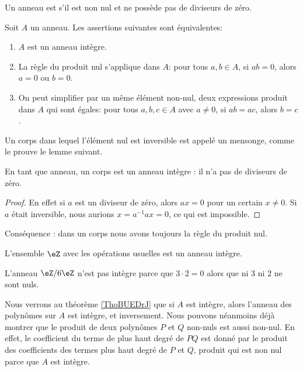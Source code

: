 \begin{definition}
    Un anneau est  s'il est non nul et ne possède pas de diviseurs de zéro.
\end{definition}

\begin{proposition}
    Soit $A$ un anneau. Les assertions suivantes sont équivalentes:
    \begin{enumerate}
        \item
            $A$ est un anneau intègre.
        \item
            La règle du produit nul s'applique dans $A$: pour tous \( a, b \in A \), si \( ab=0\), alors \( a = 0\) ou \( b = 0\).
        \item
            On peut simplifier par un même élément non-nul, deux expressions produit dans $A$ qui sont égales: pour tous \( a, b, c \in A \) avec \( a \neq 0 \), si \( ab = ac \), alors \( b = c \).
    \end{enumerate}
\end{proposition}

Un corps dans lequel l'élément nul est inversible est appelé un mensonge, comme le prouve le lemme suivant.
\begin{lemma}       \label{LemAnnCorpsnonInterdivzer}
    En tant que anneau, un corps est un anneau intègre : il n'a pas de diviseurs de zéro. 
\end{lemma}

\begin{proof}
    En effet si \( a\) est un diviseur de zéro, alors \( ax=0\) pour un certain \( x\neq 0\). Si \( a\) était inversible, nous aurions \( x=a^{-1}ax=0\), ce qui est impossible.
\end{proof}
Conséquence : dans un corps nous avons toujours la règle du produit nul.


\begin{example}
    L'ensemble \( \eZ\) avec les opérations usuelles est un anneau intègre.
\end{example}

\begin{example}
    L'anneau \( \eZ/6\eZ\) n'est pas intègre parce que \( 3\cdot 2=0\) alors que ni \( 3\) ni \( 2\) ne sont nuls.
\end{example}

\begin{example}   \label{ExybCZyl}
    Nous verrons au théorème \ref{ThoBUEDrJ} que si \( A\) est intègre, alors l'anneau des polynômes sur \( A\) est intègre, et inversement. Nous pouvons néanmoins déjà montrer que le produit de deux polynômes \( P\) et \( Q\) non-nuls est aussi non-nul. En effet, le coefficient du terme de plus haut degré de \( PQ\) est donné par le produit des coefficients des termes plus haut degré de \( P\) et \( Q\), produit qui est non nul parce que \( A\) est intègre.
\end{example}

